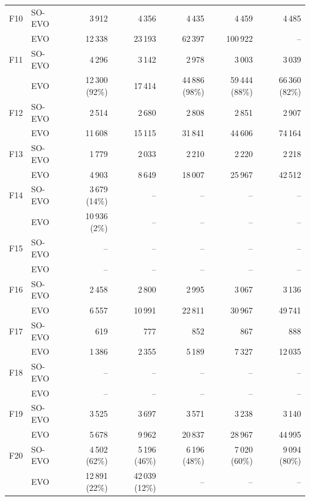 \begin{table}[htbp]
\begin{tabular}{llrrrrr}
F10 & SO-EVO & 3\,912 & 4\,356 & 4\,435 & 4\,459 & 4\,485 \\
 & EVO & 12\,338 & 23\,193 & 62\,397 & 100\,922 & -- \\[2pt]
F11 & SO-EVO & 4\,296 & 3\,142 & 2\,978 & 3\,003 & 3\,039 \\
 & EVO & 12\,300 (92\%) & 17\,414 & 44\,886 (98\%) & 59\,444 (88\%) & 66\,360 (82\%) \\[2pt]
F12 & SO-EVO & 2\,514 & 2\,680 & 2\,808 & 2\,851 & 2\,907 \\
 & EVO & 11\,608 & 15\,115 & 31\,841 & 44\,606 & 74\,164 \\[2pt]
F13 & SO-EVO & 1\,779 & 2\,033 & 2\,210 & 2\,220 & 2\,218 \\
 & EVO & 4\,903 & 8\,649 & 18\,007 & 25\,967 & 42\,512 \\[2pt]
F14 & SO-EVO & 3\,679 (14\%) & -- & -- & -- & -- \\
 & EVO & 10\,936 (2\%) & -- & -- & -- & -- \\[2pt]
F15 & SO-EVO & -- & -- & -- & -- & -- \\
 & EVO & -- & -- & -- & -- & -- \\[2pt]
F16 & SO-EVO & 2\,458 & 2\,800 & 2\,995 & 3\,067 & 3\,136 \\
 & EVO & 6\,557 & 10\,991 & 22\,811 & 30\,967 & 49\,741 \\[2pt]
F17 & SO-EVO & 619 & 777 & 852 & 867 & 888 \\
 & EVO & 1\,386 & 2\,355 & 5\,189 & 7\,327 & 12\,035 \\[2pt]
F18 & SO-EVO & -- & -- & -- & -- & -- \\
 & EVO & -- & -- & -- & -- & -- \\[2pt]
F19 & SO-EVO & 3\,525 & 3\,697 & 3\,571 & 3\,238 & 3\,140 \\
 & EVO & 5\,678 & 9\,962 & 20\,837 & 28\,967 & 44\,995 \\[2pt]
F20 & SO-EVO & 4\,502 (62\%) & 5\,196 (46\%) & 6\,196 (48\%) & 7\,020 (60\%) & 9\,094 (80\%) \\
 & EVO & 12\,891 (22\%) & 42\,039 (12\%) & -- & -- & -- \\[2pt]
\bottomrule
\end{tabular}
\end{table}
